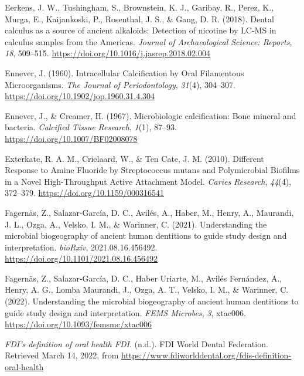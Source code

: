 \documentclass[
  letterpaper,
]{book}
\newlength{\cslhangindent}
\newlength{\cslentryspacingunit} %
\newenvironment{CSLReferences}[2] %
 {%
  \setlength{\parindent}{0pt}
  \ifodd #1
  \let\oldpar\par
  \def\par{\hangindent=\cslhangindent\oldpar}
  \fi
  \setlength{\parskip}{#2\cslentryspacingunit}
 }%
 {}
\begin{document}
\begin{CSLReferences}{1}{0}
\leavevmode{}%
Eerkens, J. W., Tushingham, S., Brownstein, K. J., Garibay, R., Perez,
K., Murga, E., Kaijankoski, P., Rosenthal, J. S., \& Gang, D. R. (2018).
Dental calculus as a source of ancient alkaloids: {Detection} of
nicotine by {LC-MS} in calculus samples from the {Americas}.
\emph{Journal of Archaeological Science: Reports}, \emph{18}, 509--515.
\url{https://doi.org/10.1016/j.jasrep.2018.02.004}

\leavevmode{}%
Ennever, J. (1960). Intracellular {Calcification} by {Oral Filamentous
Microorganisms}. \emph{The Journal of Periodontology}, \emph{31}(4),
304--307. \url{https://doi.org/10.1902/jop.1960.31.4.304}

\leavevmode{}%
Ennever, J., \& Creamer, H. (1967). Microbiologic calcification: {Bone}
mineral and bacteria. \emph{Calcified Tissue Research}, \emph{1}(1),
87--93. \url{https://doi.org/10.1007/BF02008078}

\leavevmode{}%
Exterkate, R. A. M., Crielaard, W., \& Ten Cate, J. M. (2010). Different
{Response} to {Amine Fluoride} by {Streptococcus} mutans and
{Polymicrobial Biofilms} in a {Novel High-Throughput Active Attachment
Model}. \emph{Caries Research}, \emph{44}(4), 372--379.
\url{https://doi.org/10.1159/000316541}

\leavevmode{}%
Fagernäs, Z., Salazar-García, D. C., Avilés, A., Haber, M., Henry, A.,
Maurandi, J. L., Ozga, A., Velsko, I. M., \& Warinner, C. (2021).
Understanding the microbial biogeography of ancient human dentitions to
guide study design and interpretation. \emph{bioRxiv},
2021.08.16.456492. \url{https://doi.org/10.1101/2021.08.16.456492}

\leavevmode{}%
Fagernäs, Z., Salazar-García, D. C., Haber Uriarte, M., Avilés
Fernández, A., Henry, A. G., Lomba Maurandi, J., Ozga, A. T., Velsko, I.
M., \& Warinner, C. (2022). Understanding the microbial biogeography of
ancient human dentitions to guide study design and interpretation.
\emph{FEMS Microbes}, \emph{3}, xtac006.
\url{https://doi.org/10.1093/femsmc/xtac006}

\leavevmode{}%
\emph{{FDI}'s definition of oral health \textbar{} {FDI}}. (n.d.). {FDI
World Dental Federation}. Retrieved March 14, 2022, from
\url{https://www.fdiworlddental.org/fdis-definition-oral-health}


\end{CSLReferences}
\end{document}
